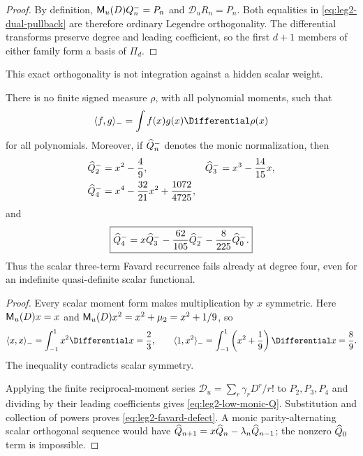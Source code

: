 \begin{proof}
By definition,
$\mathsf M_u(D)Q_n^-=P_n$ and $\mathscr D_uR_n=P_n$.  Both equalities in
\eqref{eq:leg2-dual-pullback} are therefore ordinary Legendre orthogonality.
The differential transforms preserve degree and leading coefficient, so the
first $d+1$ members of either family form a basis of $\Pi_d$.
\end{proof}

This exact orthogonality is not integration against a hidden scalar weight.

\begin{proposition}
\label{prop:leg2-no-scalar-measure}
There is no finite signed measure $\rho$, with all polynomial moments, such
that
\[
 \langle f,g\rangle_-=\int f(x)g(x)\Differential\rho(x)
\]
for all polynomials.  Moreover, if $\widehat Q_{n}^{-}$ denotes the monic
normalization, then
\begin{align}
 \widehat Q_{2}^{-}&=x^2-\frac49,&
 \widehat Q_{3}^{-}&=x^3-\frac{14}{15}x,\notag\\
 \widehat Q_{4}^{-}&=x^4-\frac{32}{21}x^2+\frac{1072}{4725},
 \label{eq:leg2-low-monic-Q}
\end{align}
and
\begin{equation}
 \boxed{\widehat Q_{4}^{-}
 =x\widehat Q_{3}^{-}-\frac{62}{105}\widehat Q_{2}^{-}
 -\frac8{225}\widehat Q_{0}^{-}.}
 \label{eq:leg2-favard-defect}
\end{equation}
Thus the scalar three-term Favard recurrence fails already at degree four,
even for an indefinite quasi-definite scalar functional.
\end{proposition}

\begin{proof}
Every scalar moment form makes multiplication by $x$ symmetric.  Here
$\mathsf M_u(D)x=x$ and
$\mathsf M_u(D)x^2=x^2+\mu_2=x^2+1/9$, so
\[
 \langle x,x\rangle_-=\int_{-1}^{1}x^2\Differential x=\frac23,
 \qquad
 \langle1,x^2\rangle_-=
 \int_{-1}^{1}\left(x^2+\frac19\right)\Differential x=\frac89.
\]
The inequality contradicts scalar symmetry.

Applying the finite reciprocal-moment series
$\mathscr D_u=\sum_r\gamma_rD^r/r!$ to $P_2,P_3,P_4$ and dividing by their
leading coefficients gives \eqref{eq:leg2-low-monic-Q}.  Substitution and
collection of powers proves \eqref{eq:leg2-favard-defect}.  A monic
parity-alternating scalar orthogonal sequence would have
$\widehat Q_{n+1}=x\widehat Q_{n}-\lambda_n\widehat Q_{n-1}$; the nonzero
$\widehat Q_{0}$ term is impossible.
\end{proof}

